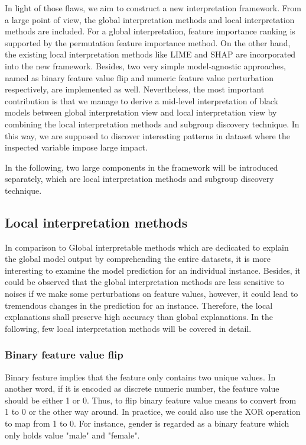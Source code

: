 In light of those flaws, we aim to construct a new interpretation framework. From a large point of view, the global interpretation methods and local interpretation methods are included. For a global interpretation, feature importance ranking is supported by the permutation feature importance method. On the other hand, the existing local interpretation methods like LIME and SHAP are incorporated into the new framework. Besides, two very simple model-agnostic approaches, named as binary feature value flip and numeric feature value perturbation respectively, are implemented as well. Nevertheless, the most important contribution is that we manage to derive a mid-level interpretation of black models between global interpretation view and local interpretation view by combining the local interpretation methods and subgroup discovery technique. In this way, we are supposed to discover interesting patterns in dataset where the inspected variable impose large impact. 

In the following, two large components in the framework will be introduced separately, which are local interpretation methods and subgroup discovery technique. 

\subsection{Local interpretation methods}

In comparison to Global interpretable methods which are dedicated to explain the global model output by comprehending the entire datasets, it is more interesting to examine the model prediction for an individual instance. Besides, it could be observed that the global interpretation methods are less sensitive to noises if we make some perturbations on feature values, however, it could lead to tremendous changes in the prediction for an instance. Therefore, the local explanations shall preserve high accuracy than global explanations. In the following, few local interpretation methods will be covered in detail. 

\subsubsection{Binary feature value flip}

Binary feature implies that the feature only contains two unique values. In another word, if it is encoded as discrete numeric number, the feature value should be either 1 or 0. Thus, to flip binary feature value means to convert from 1 to 0 or the other way around. In practice, we could also use the XOR operation to map from 1 to 0. For instance, gender is regarded as a binary feature which only holds value "male" and "female". 

